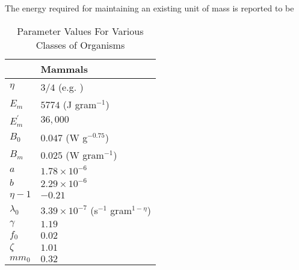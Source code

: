 \documentclass{pnastwo}
\begin{document}
\begin{article}
The energy required for maintaining an existing unit of mass is reported to be 

\onecolumn

\begin{table}[h]
\caption{Parameter Values For Various Classes of Organisms}
\label{param}
    \begin{center}
    \small
     \begin{tabular}{| p{1.2cm}| p{4.2cm} | }
     \hline
     & {\bf Mammals}  \\
     \hline
   $\eta$ & $3/4$  \quad \quad  (e.g. \cite{West:2001bv,moses2008rmo,hou}) \\ 
   $E_{m}$ & $5774$ (J gram$^{-1}$)  \quad \quad  \cite{moses2008rmo,West:2001bv,hou} \\ 
   $E_{m}^{\prime}$ & $36,000$  \quad \quad \cite{stryer,hou} \\ 
   $B_{0}$ & $0.047$ (W g$^{-0.75}$)    \quad \quad \cite{hou}  \\
   $B_{m}$ & $0.025$ (W gram$^{-1}$) \quad \quad \\
   $a$ & $1.78\times10^{-6}$  \quad \quad \\ 
   $b$ & $2.29\times10^{-6}$  \quad \quad \\  
   $\eta-1$ & $-0.21$  \quad \quad \\ 
   $\lambda_{0}$ & $3.39\times10^{-7}$ (s$^{-1}$ gram$^{1-\eta}$) \quad \quad \\ 
   $\gamma$ & $1.19$ \quad \quad \\ 
   $f_{0}$ & $0.02$ \quad \quad \\ 
   $\zeta$ & $1.01$  \quad \quad \\ 
   $mm_{0}$ & $0.32$  \quad \quad \\ 
   
      
   \hline
    \end{tabular}
    \end{center}
   \end{table}











\end{article}
\end{document}
